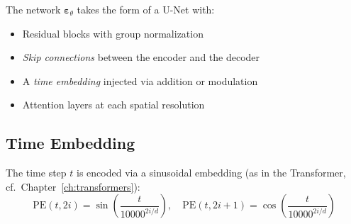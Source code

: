 The network $\boldsymbol{\varepsilon}_\theta$ takes the form of a U-Net with:
\begin{itemize}
    \item Residual blocks with group normalization
    \item \emph{Skip connections} between the encoder and the decoder
    \item A \emph{time embedding} injected via addition or modulation
    \item Attention layers at each spatial resolution
\end{itemize}

\subsection{Time Embedding}

The time step $t$ is encoded via a sinusoidal embedding (as in
the Transformer, cf.\ Chapter~\ref{ch:transformers}):
\begin{equation}
\text{PE}(t, 2i) = \sin\!\left(\frac{t}{10000^{2i/d}}\right), \quad
\text{PE}(t, 2i+1) = \cos\!\left(\frac{t}{10000^{2i/d}}\right)
\end{equation}

